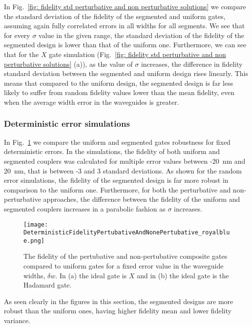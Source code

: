 \documentclass[floatfix,reprint, amsmath,amssymb,aps,superscriptaddress,nofootinbib]{revtex4-2}
\begin{document}
In Fig.~\ref{fig: fidelity std perturbative and non perturbative solutions} we compare the standard deviation of the fidelity of the segmented and uniform gates, assuming again fully correlated errors in all widths for all segments. We see that for every $\sigma$ value in the given range, the  standard deviation of the fidelity of the segmented design is lower than that of the uniform one. Furthermore, we can see that for the $X$ gate simulation (Fig.~\ref{fig: fidelity std perturbative and non perturbative solutions} (a)), as the  value of $\sigma$ increases, the difference in fidelity standard deviation between the segmented and uniform design rises linearly. This means that compared to the uniform design, the segmented design is far less likely to suffer from random fidelity values lower than the mean fidelity, even when the average width error in the waveguides is greater.

\subsubsection{Deterministic error simulations}


In Fig.~\ref{fig: deterministic perturbative and non perturbative solutions} we compare the uniform and segmented gates robustness for fixed deterministic errors. In the simulations, the fidelity of both uniform and segmented couplers was calculated for multiple error values between -20~nm and 20~nm, that is between -3 and 3 standard deviations.
As shown for the random error simulations, the fidelity of the segmented design is far more robust in comparison to the uniform one.
Furthermore, for both the perturbative and non-perturbative approaches, the difference between the fidelity of the uniform and segmented couplers increases in a parabolic fashion as $\sigma$ increases.

\begin{figure}[!h]
     \centering
     \texttt{[image: DeterministicFidelityPertubativeAndNonePertubative\_royalblue.png]}
     \caption{The fidelity of the pertubative and non-pertubative composite gates compared to uniform gates for a fixed error value in the waveguide widths, $\delta w$. In (a) the ideal gate is $X$ and in (b) the ideal gate is the Hadamard gate.}
     \label{fig: deterministic perturbative and non perturbative solutions}
\end{figure}


As seen clearly in the figures in this section, the segmented designs are more robust than the uniform ones, having higher fidelity mean and lower fidelity variance.
\end{document}
